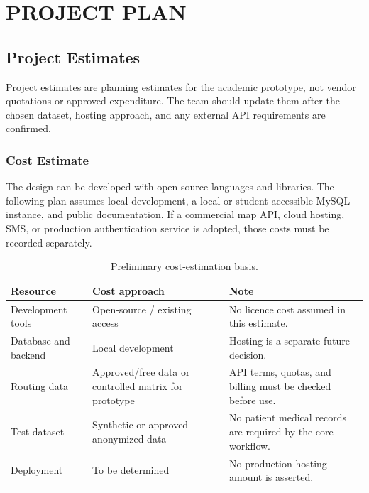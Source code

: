 \documentclass[12pt,a4paper,oneside]{report}
\begin{document}
\chapter{PROJECT PLAN}

\section{Project Estimates}
Project estimates are planning estimates for the academic prototype, not vendor quotations or approved expenditure. The team should update them after the chosen dataset, hosting approach, and any external API requirements are confirmed.

\subsection{Cost Estimate}
The design can be developed with open-source languages and libraries. The following plan assumes local development, a local or student-accessible MySQL instance, and public documentation. If a commercial map API, cloud hosting, SMS, or production authentication service is adopted, those costs must be recorded separately.
\begin{table}[htbp]
\centering
\begin{tabularx}{\textwidth}{p{42mm}p{40mm}X}
\toprule
\textbf{Resource} & \textbf{Cost approach} & \textbf{Note}\\
\midrule
Development tools & Open-source / existing access & No licence cost assumed in this estimate.\\
Database and backend & Local development & Hosting is a separate future decision.\\
Routing data & Approved/free data or controlled matrix for prototype & API terms, quotas, and billing must be checked before use.\\
Test dataset & Synthetic or approved anonymized data & No patient medical records are required by the core workflow.\\
Deployment & To be determined & No production hosting amount is asserted.\\
\bottomrule
\end{tabularx}
\caption{Preliminary cost-estimation basis.}
\end{table}
\end{document}
